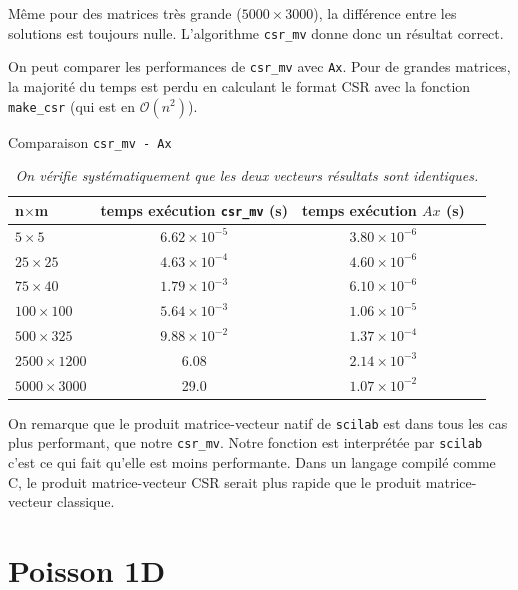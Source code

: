 \documentclass{article}
\begin{document}
Même pour des matrices très grande (\(5000\times3000\)), la différence entre les solutions est toujours nulle. L'algorithme \texttt{csr\_mv} donne donc un résultat correct.

On peut comparer les performances de \texttt{csr\_mv} avec \texttt{Ax}. Pour de grandes matrices, la majorité du temps est perdu en calculant le format CSR avec la fonction \texttt{make\_csr} (qui est en \(\mathcal{O}(n^2)\)). 

\begin{table}[H]
\caption{Comparaison \texttt{csr\_mv - Ax}}
\renewcommand*\arraystretch{1.3}
\begin{tabular}{|l|c|c|c|}
  \hline
  n\(\times\)m & temps exécution \texttt{csr\_mv} (s) & temps exécution \(Ax\) (s) \\
  \hline
	\(5 \times 5\)		&	\(6.62 \times 10^{-5}\)	&	\(3.80 \times 10^{-6}\)	\\
	\(25 \times 25\)	&	\(4.63 \times 10^{-4}\)	&	\(4.60 \times 10^{-6}\)	\\
	\(75 \times 40\)	&	\(1.79 \times 10^{-3}\)	&	\(6.10 \times 10^{-6}\)	\\
	\(100 \times 100\)	&	\(5.64 \times 10^{-3}\)	&	\(1.06 \times 10^{-5}\)	\\
	\(500 \times 325\)	&	\(9.88 \times 10^{-2}\)	&	\(1.37 \times 10^{-4}\)	\\
	\(2500 \times 1200\)&	6.08					&	\(2.14 \times 10^{-3}\)	\\
	\(5000 \times 3000\)&	29.0					&	\(1.07 \times 10^{-2}\)	\\
  \hline
\end{tabular}
\caption*{\textit{On vérifie systématiquement que les deux vecteurs résultats sont identiques.}}
\end{table}



On remarque que le produit matrice-vecteur natif de \texttt{scilab} est dans tous les cas plus performant, que notre \texttt{csr\_mv}. Notre fonction est interprétée par \texttt{scilab} c'est ce qui fait qu'elle est moins performante. Dans un langage compilé comme C, le produit matrice-vecteur CSR serait plus rapide que le produit matrice-vecteur classique.

\section{Poisson 1D}
\end{document}
